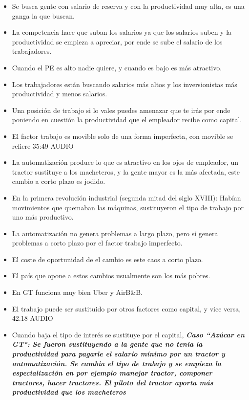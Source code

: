 \begin{itemize}
    \item Se busca gente con salario de reserva y con la productividad muy alta, es una ganga la que buscan.
    \item La competencia hace que suban los salarios ya que los salarios suben y la productividad se empieza a apreciar, por ende se sube el salario de los trabajadores.
    \item Cuando el PE es alto nadie quiere, y cuando es bajo es más atractivo.
    \item Los trabajadores están buscando salarios más altos y los inversionistas más productividad y menos salarios.
    \item Una posición de trabajo si lo vales puedes amenazar que te irás por ende poniendo en cuestión la productividad que el empleador recibe como capital.
    \item El factor trabajo es movible solo de una forma imperfecta, con movible se refiere  35:49 AUDIO
    \item La automatización produce lo que es atractivo en los ojos de empleador, un tractor sustituye a los macheteros, y la gente mayor es la más afectada, este cambio a corto plazo es jodido.
    \item En la primera revolución industrial (segunda mitad del siglo XVIII): Habían movimientos que quemaban las máquinas, sustituyeron el tipo de trabajo por uno más productivo.
    \item La automatización no genera problemas a largo plazo, pero sí genera problemas a corto plazo por el factor trabajo imperfecto.
    \item El coste de oportunidad de el cambio es este caos a corto plazo.
    \item El país que opone a estos cambios usualmente son los más pobres.
    \item En GT funciona muy bien Uber y AirB\&B.
    \item El trabajo puede ser sustituido por otros factores como capital, y vice versa, 42.18 AUDIO
    \item Cuando baja el tipo de interés se sustituye por el capital, \textbf{\emph{Caso ``Azúcar en GT": Se fueron sustituyendo a la gente que no tenía la productividad para pagarle el salario mínimo por un tractor y automatización. Se cambia el tipo de trabajo y se empieza la especialización en por ejemplo manejar tractor, componer tractores, hacer tractores. El piloto del tractor aporta más productividad que los macheteros}}

\end{itemize}
